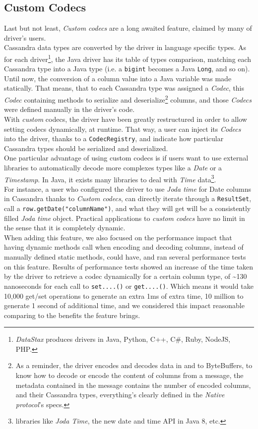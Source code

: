 \documentclass[a4paper]{report}
\newcommand{\ds}{\emph{DataStax\xspace}}
\begin{document}
\subsection{Custom Codecs}
Last but not least, \emph{Custom codecs} are a long awaited feature, claimed by many of driver's users.\\
Cassandra data types are converted by the driver in language specific types. As for each driver\footnote{\ds{} produces drivers in Java, Python, C++, C\#, Ruby, NodeJS, PHP.}, the Java driver has its table of types comparison, matching each Cassandra type into a Java type (i.e. a \verb;bigint; becomes a Java \verb;Long;, and so on). Until now, the conversion of a column value into a Java variable was made statically. That means, that to each Cassandra type was assigned a \emph{Codec}, this \emph{Codec} containing methods to serialize and deserialize\footnote{As a reminder, the driver encodes and decodes data in and to ByteBuffers, to know how to decode or encode the content of columns from a message, the metadata contained in the message contains the number of encoded columns, and their Cassandra types, everything's clearly defined in the \emph{Native protocol}'s specs.} columns, and those \emph{Codecs} were defined manually in the driver's code.\\
With \emph{custom} codecs, the driver have been greatly restructured in order to allow setting codecs dynamically, at runtime. That way, a user can inject its \emph{Codecs} into the driver, thanks to a \verb;CodecRegistry;, and indicate how particular Cassandra types should be serialized and deserialized.\\
One particular advantage of using custom codecs is if users want to use external libraries to automatically decode more complexes types like a \emph{Date} or a \emph{Timestamp}. In Java, it exists many libraries to deal with \emph{Time} data\footnote{libraries like \emph{Joda Time}, the new date and time API in Java 8, etc.}.\\ 
For instance, a user who configured the driver to use \emph{Joda time} for Date columns in Cassandra thanks to \emph{Custom codecs}, can directly iterate through a \verb;ResultSet;, call a \verb;row.getDate("columnName");, and what they will get will be a consistently filled \emph{Joda time} object. Practical applications to \emph{custom codecs} have no limit in the sense that it is completely dynamic.\\
When adding this feature, we also focused on the performance impact that having dynamic methods call when encoding and decoding columns, instead of manually defined static methods, could have, and ran several performance tests on this feature. Results of performance tests showed an increase of the time taken by the driver to retrieve a codec dynamically for a certain column type, of \textasciitilde{}130 nanoseconds for each call to \verb;set....(); or \verb;get....();. Which means it would take 10,000 get/set operations to generate an extra 1ms of extra time, 10 million to generate 1 second of additional time, and we considered this impact reasonable comparing to the benefits the feature brings.
\end{document}
